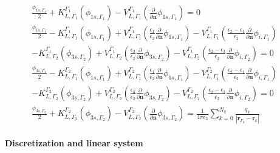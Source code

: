 \begin{align} \label{eq:integral_eq_lspr_nobc_system}
\frac{\phi_{1s,\Gamma_1}}{2}+ K_{L,\Gamma_1}^{\Gamma_1}(\phi_{1s,\Gamma_1}) - V_{L,\Gamma_1}^{\Gamma_1} \left(\frac{\partial}{\partial \mathbf{n}}\phi_{1s,\Gamma_1} \right) = 0 & \nonumber \\
\frac{\phi_{1s,\Gamma_1}}{2} - K_{L,\Gamma_1}^{\Gamma_1}(\phi_{1s,\Gamma_1}) + V_{L,\Gamma_1}^{\Gamma_1} \left(\frac{\epsilon_1}{\epsilon_2}\frac{\partial}{\partial \mathbf{n}}\phi_{1s,\Gamma_1} \right) - V_{L,\Gamma_1}^{\Gamma_1} \left(\frac{\epsilon_2-\epsilon_1}{\epsilon_2}\frac{\partial}{\partial \mathbf{n}}\phi_{i,\Gamma_1} \right) & \nonumber\\
 - K_{L,\Gamma_2}^{\Gamma_1}(\phi_{3s,\Gamma_2}) + V_{L,\Gamma_2}^{\Gamma_1} \left(\frac{\epsilon_3}{\epsilon_2}\frac{\partial}{\partial \mathbf{n}}\phi_{3s,\Gamma_2} \right)  - V_{L,\Gamma_2}^{\Gamma_1} \left(\frac{\epsilon_2 -\epsilon_3}{\epsilon_2}\frac{\partial}{\partial \mathbf{n}}\phi_{i,\Gamma_2} \right) = 0 &  \nonumber \\
\frac{\phi_{3s,\Gamma_1}}{2} - K_{L,\Gamma_1}^{\Gamma_2}(\phi_{1s,\Gamma_1}) + V_{L,\Gamma_1}^{\Gamma_2} \left(\frac{\epsilon_1}{\epsilon_2}\frac{\partial}{\partial \mathbf{n}}\phi_{1s,\Gamma_1} \right) - V_{L,\Gamma_1}^{\Gamma_2} \left(\frac{\epsilon_2-\epsilon_1}{\epsilon_2}\frac{\partial}{\partial \mathbf{n}}\phi_{i,\Gamma_1} \right) & \nonumber\\
 - K_{L,\Gamma_2}^{\Gamma_2}(\phi_{3s,\Gamma_2}) + V_{L,\Gamma_2}^{\Gamma_2} \left(\frac{\epsilon_3}{\epsilon_2}\frac{\partial}{\partial \mathbf{n}}\phi_{3s,\Gamma_2} \right)  - V_{L,\Gamma_2}^{\Gamma_2} \left(\frac{\epsilon_2 -\epsilon_3}{\epsilon_2}\frac{\partial}{\partial \mathbf{n}}\phi_{i,\Gamma_2} \right) = 0 &  \nonumber \\
\frac{\phi_{3s,\Gamma_2}}{2} + K_{L,\Gamma_2}^{\Gamma_2}(\phi_{3s,\Gamma_2}) - V_{L,\Gamma_2}^{\Gamma_2} \left( \frac{\partial}{\partial \mathbf{n}} \phi_{3s,\Gamma_2} \right) = \frac{1}{4\pi\epsilon_3} \sum_{k=0}^{N_q} \frac{q_k}{|\mathbf{r}_{\Gamma_2} - \mathbf{r}_k|} &
\end{align}


\paragraph{Discretization and linear system}

